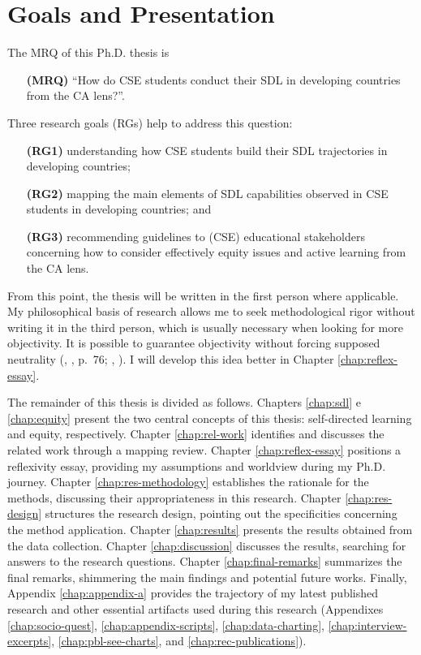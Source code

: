 \section{Goals and Presentation}
\label{intro-sec:goals-pres}

The \gls{MRQ} of this \gls{Ph.D.} thesis is 
\begin{itemize}
    \item[\textbf{(\gls{MRQ})}] ``How do \gls{CSE} students conduct their \gls{SDL} in developing countries from the \gls{CA} lens?''.
\end{itemize}
Three research goals (\glspl{RG}) help to address this question: 
\begin{itemize}
    \item[\textbf{(\gls{RG}1)}] understanding how \gls{CSE} students build their \gls{SDL} trajectories in developing countries; 
    \item[\textbf{(\gls{RG}2)}] mapping the main elements of \gls{SDL} capabilities observed in \gls{CSE} students in developing countries; and
    \item[\textbf{(\gls{RG}3)}] recommending guidelines to (\gls{CSE}) educational stakeholders concerning how to consider effectively equity issues and active learning from the \gls{CA} lens.
\end{itemize} 

From this point, the thesis will be written in the first person where applicable. My philosophical basis of research allows me to seek methodological rigor without writing it in the third person, which is usually necessary when looking for more objectivity. It is possible to guarantee objectivity without forcing supposed neutrality (\citeauthor{saviani:1994}, \citeyear{saviani:1994}, p.~76; \citeauthor{bispojr:2022-educomp}, \citeyear{bispojr:2022-educomp}). I will develop this idea better in Chapter \ref{chap:reflex-essay}.

The remainder of this thesis is divided as follows. Chapters \ref{chap:sdl} e \ref{chap:equity} present the two central concepts of this thesis: self-directed learning and equity, respectively. Chapter \ref{chap:rel-work} identifies and discusses the related work through a mapping review. Chapter \ref{chap:reflex-essay} positions a reflexivity essay, providing my assumptions and worldview during my \gls{Ph.D.} journey. Chapter \ref{chap:res-methodology} establishes the rationale for the methods, discussing their appropriateness in this research. Chapter \ref{chap:res-design} structures the research design, pointing out the specificities concerning the method application. Chapter \ref{chap:results} presents the results obtained from the data collection. Chapter \ref{chap:discussion} discusses the results, searching for answers to the research questions. Chapter \ref{chap:final-remarks} summarizes the final remarks, shimmering the main findings and potential future works. Finally, Appendix \ref{chap:appendix-a} provides the trajectory of my latest published research and other essential artifacts used during this research (Appendixes \ref{chap:socio-quest}, \ref{chap:appendix-scripts}, \ref{chap:data-charting}, \ref{chap:interview-excerpts}, \ref{chap:pbl-see-charts}, and \ref{chap:rec-publications}).


